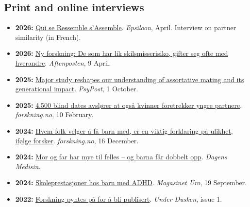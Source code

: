 \documentclass[10pt,a4paper]{article}
\let\cvhref\href
\renewcommand{\href}[2]{\cvhref{#1}{\underline{#2}}}%
\begin{document}
\subsection*{Print and online interviews}
\begin{itemize}
\item \textbf{2026:} \href{https://www.epsiloon.com/tous-les-numeros/n58/qui_se_ressemble_s_assemble/}{Qui se Ressemble s'Assemble}. \textit{Epsiloon}, April. Interview on partner similarity (in French).
\item \textbf{2026:} \href{https://www.aftenposten.no/sex-og-samliv/i/7p7Kk3/ny-forskning-de-som-har-lik-skilsmisserisiko-gifter-seg-ofte-med-hverandre}{Ny forskning: De som har lik skilsmisserisiko, gifter seg ofte med hverandre}. \textit{Aftenposten}, 9 April.
\item \textbf{2025:} \href{https://www.psypost.org/major-study-reshapes-our-understanding-of-assortative-mating-and-its-generational-impact/}{Major study reshapes our understanding of assortative mating and its generational impact}. \textit{PsyPost}, 1 October.
\item \textbf{2025:} \href{https://www.forskning.no/4500-blind-dates-avslorer-at-ogsa-kvinner-foretrekker-yngre-partnere/2462441}{4.500 blind dates avslører at også kvinner foretrekker yngre partnere}. \textit{forskning.no}, 10 February.
\item \textbf{2024:} \href{https://www.forskning.no/finans-penger-og-privatokonomi-okonomi/hvem-folk-velger-a-fa-barn-med-er-en-viktig-forklaring-pa-ulikhet-ifolge-forsker/2437555}{Hvem folk velger å få barn med, er en viktig forklaring på ulikhet, ifølge forsker}. \textit{forskning.no}, 16 December.
\item \textbf{2024:} \href{https://www.dagensmedisin.no/genetikk-psykisk-helse-sosial-ulikhet/mor-og-far-har-mye-til-felles-og-barna-far-dobbelt-opp/662723}{Mor og far har mye til felles -- og barna får dobbelt opp}. \textit{Dagens Medisin}.
\item \textbf{2024:} \href{https://www.adhdnorge.no/artikkel/skoleprestasjoner-hos-barn-med-adhd}{Skoleprestasjoner hos barn med ADHD}. \textit{Magasinet Uro}, 19 September.
\item \textbf{2022:} \href{https://underdusken.no/forskning-pyntes-pa-for-a-bli-publisert/298336}{Forskning pyntes på for å bli publisert}. \textit{Under Dusken}, issue 1.
\end{itemize}
\end{document}
